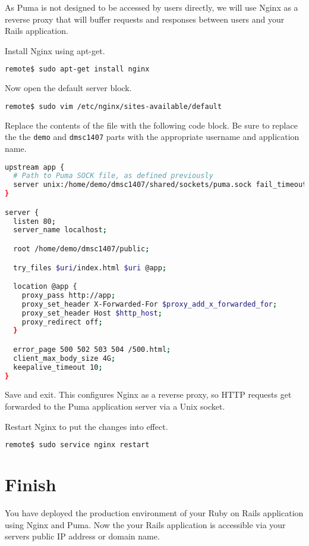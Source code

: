As Puma is not designed to be accessed by users directly,
we will use Nginx as a reverse proxy
that will buffer requests and responses between
users and your Rails application.

Install Nginx using apt-get.

\begin{minipage}{\linewidth}
\begin{lstlisting}[language=bash]
remote$ sudo apt-get install nginx
\end{lstlisting}
\end{minipage}

Now open the default server block.

\begin{minipage}{\linewidth}
\begin{lstlisting}[language=bash]
remote$ sudo vim /etc/nginx/sites-available/default
\end{lstlisting}
\end{minipage}

Replace the contents of the file with the following code block.
Be sure to replace the the \texttt{demo} and \texttt{dmsc1407} parts
with the appropriate username and application name.

\begin{minipage}{\linewidth}
  \begin{lstlisting}[language=bash, caption={/etc/nginx/sites-available/default}]
upstream app {
  # Path to Puma SOCK file, as defined previously
  server unix:/home/demo/dmsc1407/shared/sockets/puma.sock fail_timeout=0;
}

server {
  listen 80;
  server_name localhost;

  root /home/demo/dmsc1407/public;

  try_files $uri/index.html $uri @app;

  location @app {
    proxy_pass http://app;
    proxy_set_header X-Forwarded-For $proxy_add_x_forwarded_for;
    proxy_set_header Host $http_host;
    proxy_redirect off;
  }

  error_page 500 502 503 504 /500.html;
  client_max_body_size 4G;
  keepalive_timeout 10;
}
\end{lstlisting}
\end{minipage}

Save and exit. This configures Nginx as a reverse proxy, so HTTP requests
get forwarded to the Puma application server via a Unix socket.

Restart Nginx to put the changes into effect.

\begin{minipage}{\linewidth}
\begin{lstlisting}[language=bash]
remote$ sudo service nginx restart
\end{lstlisting}
\end{minipage}

\section{Finish}

You have deployed the production environment of your Ruby on Rails application using Nginx and Puma.
Now the your Rails application is accessible via your server\textquotesingle s public IP address
or domain name.
